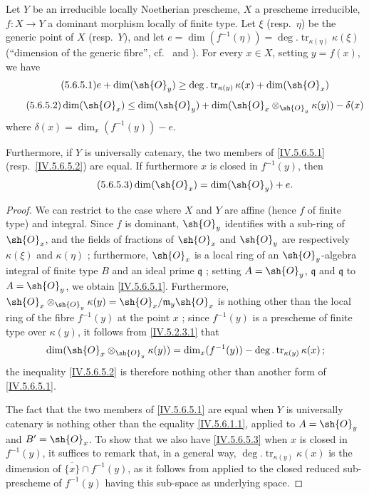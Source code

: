\begin{proposition}[5.6.5]
\label{IV.5.6.5}
Let $Y$ be an irreducible locally Noetherian prescheme, $X$ a prescheme irreducible, $f:X\to Y$ a dominant morphism locally of finite type.
Let $\xi$ (resp.\ $\eta$) be the generic point of $X$ (resp.\ $Y$), and let $e=\dim(f^{-1}(\eta))=\deg.\operatorname{tr}_{\kappa(\eta)}\kappa(\xi)$ (``dimension of the generic fibre'', cf.\  and ).
For every $x\in X$, setting $y=f(x)$, we have
\[
\tag{5.6.5.1}\label{IV.5.6.5.1}
  e + \dim(\sh{O}_y) \geq \deg.\operatorname{tr}_{\kappa(y)}\kappa(x) + \dim(\sh{O}_x)
\]
\[
\tag{5.6.5.2}\label{IV.5.6.5.2}
  \dim(\sh{O}_x) \leq \dim(\sh{O}_y) + \dim(\sh{O}_x\otimes_{\sh{O}_y}\kappa(y)) - \delta(x)
\]
where $\delta(x)=\dim_x(f^{-1}(y))-e$.

Furthermore, if $Y$ is universally catenary, the two members of \eqref{IV.5.6.5.1} (resp.\ \eqref{IV.5.6.5.2}) are equal.
If furthermore $x$ is closed in $f^{-1}(y)$, then
\[
\tag{5.6.5.3}\label{IV.5.6.5.3}
  \dim(\sh{O}_x) = \dim(\sh{O}_y) + e.
\]
\end{proposition}

\begin{proof}
We can restrict to the case where $X$ and $Y$ are affine (hence $f$ of finite type) and integral.
Since $f$ is dominant, $\sh{O}_y$ identifies with a sub-ring of $\sh{O}_x$, and the fields of fractions of $\sh{O}_x$ and $\sh{O}_y$ are respectively $\kappa(\xi)$ and $\kappa(\eta)$ ; furthermore, $\sh{O}_x$ is a local ring of an $\sh{O}_y$-algebra integral of finite type $B$ and an ideal prime $\mathfrak{q}$ ; setting $A=\sh{O}_y$, $\mathfrak{q}$ and $\mathfrak{q}$  to $A=\sh{O}_y$, we obtain \eqref{IV.5.6.5.1}.
Furthermore, $\sh{O}_x\otimes_{\sh{O}_y}\kappa(y)=\sh{O}_x/\mathfrak{m}_y\sh{O}_x$ is nothing other than the local ring of the fibre $f^{-1}(y)$ at the point $x$ ; since $f^{-1}(y)$ is a prescheme of finite type over $\kappa(y)$, it follows from \eqref{IV.5.2.3.1} that
\[
  \dim(\sh{O}_x\otimes_{\sh{O}_y}\kappa(y)) = \dim_x(f^{-1}(y)) - \deg.\operatorname{tr}_{\kappa(y)}\kappa(x)\,;
\]
the inequality \eqref{IV.5.6.5.2} is therefore nothing other than another form of \eqref{IV.5.6.5.1}.

The fact that the two members of \eqref{IV.5.6.5.1} are equal when $Y$ is universally catenary is nothing other than the equality \eqref{IV.5.6.1.1}, applied to $A=\sh{O}_y$ and $B'=\sh{O}_x$.
To show that we also have \eqref{IV.5.6.5.3} when $x$ is closed in $f^{-1}(y)$, it suffices to remark that, in a general way, $\deg.\operatorname{tr}_{\kappa(y)}\kappa(x)$ is the dimension of $\overline{\{x\}}\cap f^{-1}(y)$, as it follows from  applied to the closed reduced sub-prescheme of $f^{-1}(y)$ having this sub-space as underlying space.
\end{proof}

